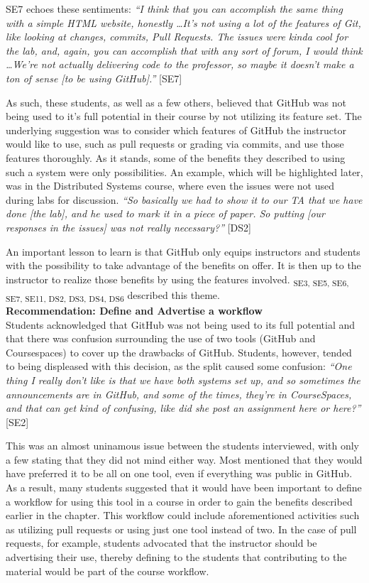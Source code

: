 SE7 echoes these sentiments: \textit{``I think that you can accomplish the same thing with a simple HTML website, honestly \ldots It's not using a lot of the features of Git, like looking at changes, commits, Pull Requests. The issues were kinda cool for the lab, and, again, you can accomplish that with any sort of forum, I would think \ldots We're not actually delivering code to the professor, so maybe it doesn't make a ton of sense [to be using GitHub].''} [SE7]

As such, these students, as well as a few others, believed that GitHub was not being used to it's full potential in their course by not utilizing its feature set. The underlying suggestion was to consider which features of GitHub the instructor would like to use, such as pull requests or grading via commits, and use those features thoroughly. As it stands, some of the benefits they described to using such a system were only possibilities. An example, which will be highlighted later, was in the Distributed Systems course, where even the issues were not used during labs for discussion. \textit{``So basically we had to show it to our TA that we have done [the lab], and he used to mark it in a piece of paper. So putting [our responses in the issues] was not really necessary?''} [DS2]

An important lesson to learn is that GitHub only equips instructors and students with the possibility to take advantage of the benefits on offer. It is then up to the instructor to realize those benefits by using the features involved. \textsubscript{SE3, SE5, SE6, SE7, SE11, DS2, DS3, DS4, DS6} described this theme. \\

\textbf{Recommendation: Define and Advertise a workflow} \\
Students acknowledged that GitHub was not being used to its full potential and that there was confusion surrounding the use of two tools (GitHub and Coursespaces) to cover up the drawbacks of GitHub. Students, however, tended to being displeased with this decision, as the split caused some confusion: \textit{``One thing I really don't like is that we have both systems set up, and so sometimes the announcements are in GitHub, and some of the times, they're in CourseSpaces, and that can get kind of confusing, like did she post an assignment here or here?''} [SE2]

This was an almost uninamous issue between the students interviewed, with only a few stating that they did not mind either way. Most mentioned that they would have preferred it to be all on one tool, even if everything was public in GitHub. As a result, many students suggested that it would have been important to define a workflow for using this tool in a course in order to gain the benefits described earlier in the chapter. This workflow could include aforementioned activities such as utilizing pull requests or using just one tool instead of two. In the case of pull requests, for example, students advocated that the instructor should be advertising their use, thereby defining to the students that contributing to the material would be part of the course workflow.

